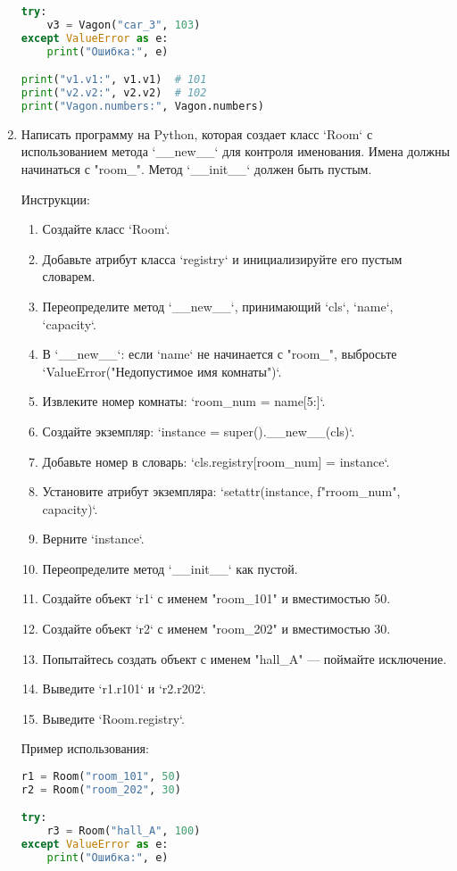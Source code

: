 \begin{enumerate}
\begin{lstlisting}[language=Python]
try:
    v3 = Vagon("car_3", 103)
except ValueError as e:
    print("Ошибка:", e)

print("v1.v1:", v1.v1)  # 101
print("v2.v2:", v2.v2)  # 102
print("Vagon.numbers:", Vagon.numbers)
\end{lstlisting}

\item Написать программу на Python, которая создает класс `Room` с использованием метода `\_\_new\_\_` для контроля именования. Имена должны начинаться с "room\_". Метод `\_\_init\_\_` должен быть пустым.

Инструкции:
\begin{enumerate}
    \item Создайте класс `Room`.
    \item Добавьте атрибут класса `registry` и инициализируйте его пустым словарем.
    \item Переопределите метод `\_\_new\_\_`, принимающий `cls`, `name`, `capacity`.
    \item В `\_\_new\_\_`: если `name` не начинается с "room\_", выбросьте `ValueError("Недопустимое имя комнаты")`.
    \item Извлеките номер комнаты: `room\_num = name[5:]`.
    \item Создайте экземпляр: `instance = super().\_\_new\_\_(cls)`.
    \item Добавьте номер в словарь: `cls.registry[room\_num] = instance`.
    \item Установите атрибут экземпляра: `setattr(instance, f"r{room\_num}", capacity)`.
    \item Верните `instance`.
    \item Переопределите метод `\_\_init\_\_` как пустой.
    \item Создайте объект `r1` с именем "room\_101" и вместимостью 50.
    \item Создайте объект `r2` с именем "room\_202" и вместимостью 30.
    \item Попытайтесь создать объект с именем "hall\_A" — поймайте исключение.
    \item Выведите `r1.r101` и `r2.r202`.
    \item Выведите `Room.registry`.
\end{enumerate}

Пример использования:
\begin{lstlisting}[language=Python]
r1 = Room("room_101", 50)
r2 = Room("room_202", 30)

try:
    r3 = Room("hall_A", 100)
except ValueError as e:
    print("Ошибка:", e)


\end{lstlisting}
\end{enumerate}

